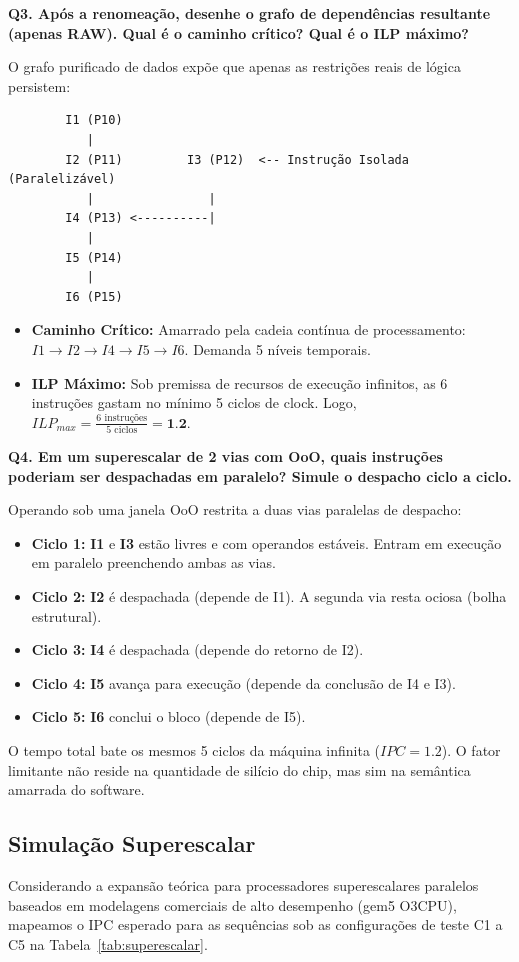 \documentclass[12pt,a4paper]{article}
\begin{document}
\textbf{Q3. Após a renomeação, desenhe o grafo de dependências resultante (apenas RAW). Qual é o caminho crítico? Qual é o ILP máximo?}

O grafo purificado de dados expõe que apenas as restrições reais de lógica persistem:
\begin{verbatim}
        I1 (P10)
           |
        I2 (P11)         I3 (P12)  <-- Instrução Isolada (Paralelizável)
           |                |
        I4 (P13) <----------|
           |
        I5 (P14)
           |
        I6 (P15)
\end{verbatim}
\begin{itemize}
    \item \textbf{Caminho Crítico:} Amarrado pela cadeia contínua de processamento: $I1 \rightarrow I2 \rightarrow I4 \rightarrow I5 \rightarrow I6$. Demanda 5 níveis temporais.
    \item \textbf{ILP Máximo:} Sob premissa de recursos de execução infinitos, as 6 instruções gastam no mínimo 5 ciclos de clock. Logo, $ILP_{max} = \frac{6 \text{ instruções}}{5 \text{ ciclos}} = \textbf{1.2}$.
\end{itemize}

\textbf{Q4. Em um superescalar de 2 vias com OoO, quais instruções poderiam ser despachadas em paralelo? Simule o despacho ciclo a ciclo.}

Operando sob uma janela OoO restrita a duas vias paralelas de despacho:
\begin{itemize}
    \item \textbf{Ciclo 1:} \textbf{I1} e \textbf{I3} estão livres e com operandos estáveis. Entram em execução em paralelo preenchendo ambas as vias.
    \item \textbf{Ciclo 2:} \textbf{I2} é despachada (depende de I1). A segunda via resta ociosa (bolha estrutural).
    \item \textbf{Ciclo 3:} \textbf{I4} é despachada (depende do retorno de I2).
    \item \textbf{Ciclo 4:} \textbf{I5} avança para execução (depende da conclusão de I4 e I3).
    \item \textbf{Ciclo 5:} \textbf{I6} conclui o bloco (depende de I5).
\end{itemize}
O tempo total bate os mesmos 5 ciclos da máquina infinita ($IPC = 1.2$). O fator limitante não reside na quantidade de silício do chip, mas sim na semântica amarrada do software.

\subsection{Simulação Superescalar}
Considerando a expansão teórica para processadores superescalares paralelos baseados em modelagens comerciais de alto desempenho (gem5 O3CPU), mapeamos o IPC esperado para as sequências sob as configurações de teste C1 a C5 na Tabela~\ref{tab:superescalar}.
\end{document}
